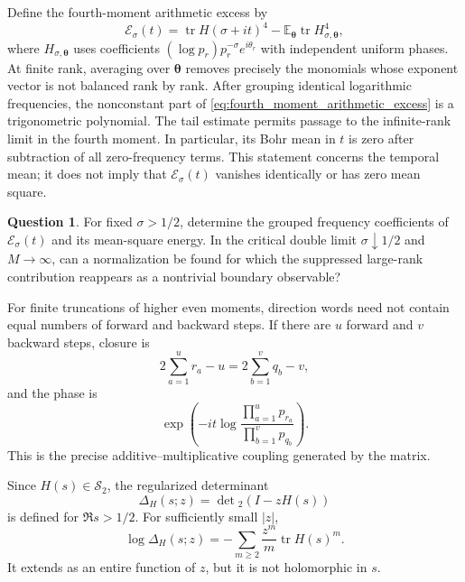 \documentclass[11pt]{amsart}
\numberwithin{equation}{section}
\theoremstyle{plain}
\theoremstyle{definition}
\newtheorem{question}[theorem]{Question}
\theoremstyle{remark}
\newcommand{\HS}{\mathcal S_2}
\newcommand{\tr}{\operatorname{tr}}
\begin{document}
Define the fourth-moment arithmetic excess by
\begin{equation}
\mathcal E_\sigma(t)
=
\tr H(\sigma+it)^4
-
\mathbb E_{\boldsymbol\theta}\tr H_{\sigma,\boldsymbol\theta}^4,
\label{eq:fourth_moment_arithmetic_excess}
\end{equation}
where $H_{\sigma,\boldsymbol\theta}$ uses coefficients $(\log p_r)p_r^{-\sigma}e^{i\theta_r}$ with independent uniform phases.  At finite rank, averaging over $\boldsymbol\theta$ removes precisely the monomials whose exponent vector is not balanced rank by rank.  After grouping identical logarithmic frequencies, the nonconstant part of \eqref{eq:fourth_moment_arithmetic_excess} is a trigonometric polynomial.  The tail estimate permits passage to the infinite-rank limit in the fourth moment.  In particular, its Bohr mean in $t$ is zero after subtraction of all zero-frequency terms.  This statement concerns the temporal mean; it does not imply that $\mathcal E_\sigma(t)$ vanishes identically or has zero mean square.

\begin{question}
\label{question:weighted_stationary_phase}
For fixed $\sigma>1/2$, determine the grouped frequency coefficients of $\mathcal E_\sigma(t)$ and its mean-square energy.  In the critical double limit $\sigma\downarrow1/2$ and $M\to\infty$, can a normalization be found for which the suppressed large-rank contribution reappears as a nontrivial boundary observable?
\end{question}

For finite truncations of higher even moments, direction words need not contain equal numbers of forward and backward steps.  If there are $u$ forward and $v$ backward steps, closure is
\begin{equation}
2\sum_{a=1}^{u}r_a-u
=
2\sum_{b=1}^{v}q_b-v,
\label{eq:higher_additive_resonance}
\end{equation}
and the phase is
\begin{equation}
\exp\left(-it\log\frac{\prod_{a=1}^{u}p_{r_a}}
{\prod_{b=1}^{v}p_{q_b}}\right).
\label{eq:higher_multiplicative_phase}
\end{equation}
This is the precise additive--multiplicative coupling generated by the matrix.

Since $H(s)\in\HS$, the regularized determinant
\begin{equation}
\Delta_H(s;z)=\det{}_2(I-zH(s))
\label{eq:regularized_determinant}
\end{equation}
is defined for $\Re s>1/2$.  For sufficiently small $|z|$,
\begin{equation}
\log\Delta_H(s;z)
=-\sum_{m\ge2}\frac{z^m}{m}\tr H(s)^m.
\label{eq:regularized_log_expansion}
\end{equation}
It extends as an entire function of $z$, but it is not holomorphic in $s$.
\end{document}
